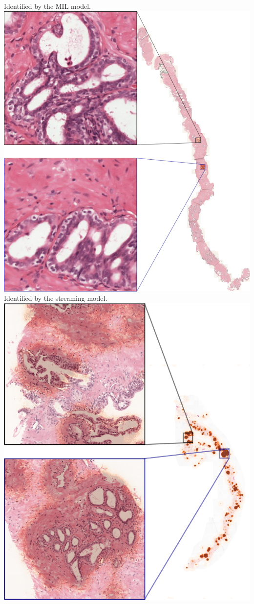 \documentclass[
  12pt,
  a5,margin=2cmpaper,
]{article}
\begin{document}
Identified by the MIL model.\includegraphics{chpt3_imgs/FP_MIL_1.png}
Identified by the streaming
model.\includegraphics{chpt3_imgs/FP_e2e_1.png}
\end{document}
